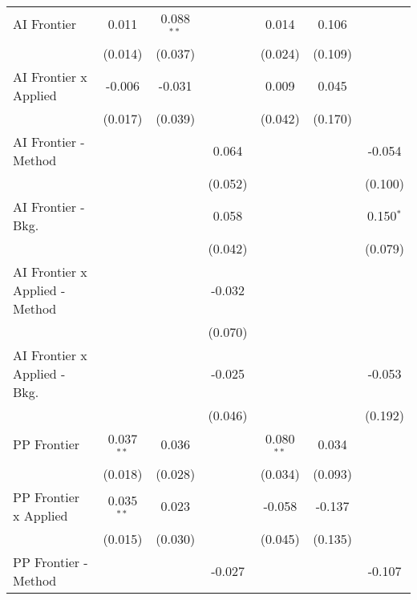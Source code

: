 \begin{tabular}{lcccccc}
   AI Frontier                    & 0.011        & 0.088$^{**}$ &              & 0.014        & 0.106       &   \\   
                                  & (0.014)      & (0.037)      &              & (0.024)      & (0.109)     &   \\   
   AI Frontier x Applied          & -0.006       & -0.031       &              & 0.009        & 0.045       &   \\   
                                  & (0.017)      & (0.039)      &              & (0.042)      & (0.170)     &   \\   
   AI Frontier - Method           &              &              & 0.064        &              &             & -0.054\\   
                                  &              &              & (0.052)      &              &             & (0.100)\\   
   AI Frontier - Bkg.             &              &              & 0.058        &              &             & 0.150$^{*}$\\   
                                  &              &              & (0.042)      &              &             & (0.079)\\   
   AI Frontier x Applied - Method &              &              & -0.032       &              &             &   \\   
                                  &              &              & (0.070)      &              &             &   \\   
   AI Frontier x Applied - Bkg.   &              &              & -0.025       &              &             & -0.053\\   
                                  &              &              & (0.046)      &              &             & (0.192)\\   
   PP Frontier                    & 0.037$^{**}$ & 0.036        &              & 0.080$^{**}$ & 0.034       &   \\   
                                  & (0.018)      & (0.028)      &              & (0.034)      & (0.093)     &   \\   
   PP Frontier x Applied          & 0.035$^{**}$ & 0.023        &              & -0.058       & -0.137      &   \\   
                                  & (0.015)      & (0.030)      &              & (0.045)      & (0.135)     &   \\   
   PP Frontier - Method           &              &              & -0.027       &              &             & -0.107\\   

\end{tabular}

